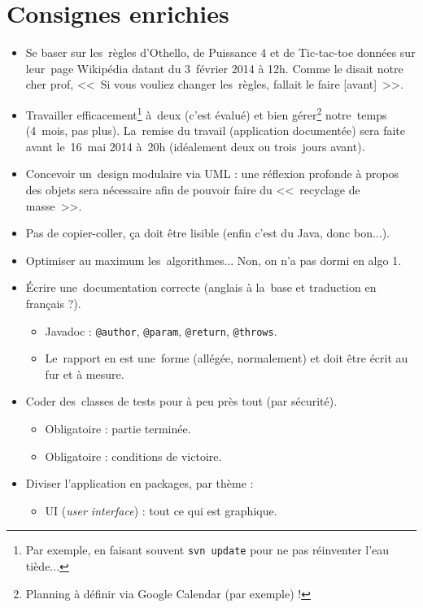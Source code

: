 \section{Consignes enrichies}
\begin{itemize}
    \item Se baser sur les~règles d'Othello, de Puissance 4 et de Tic-tac-toe données sur leur~page Wikipédia datant du 3~février 2014 à 12h. Comme le disait notre cher prof, <<~Si vous vouliez changer les~règles, fallait le faire [avant]~>>.
	\item Travailler efficacement\footnote{Par exemple, en faisant souvent \texttt{svn update} pour ne pas réinventer l'eau tiède...} à~deux (c'est évalué) et bien gérer\footnote{Planning à définir via Google Calendar (par exemple) !} notre~temps (4~mois, pas plus). La~remise du travail (application documentée) sera faite avant le~16~mai 2014 à~20h (idéalement deux ou trois~jours avant).
	\item Concevoir un~design modulaire via UML : une réflexion profonde à propos des objets sera nécessaire afin de pouvoir faire du <<~recyclage de masse~>>.
    \item Pas de copier-coller, ça doit être lisible (enfin c'est du Java, donc bon...).
	\item Optimiser au maximum les~algorithmes... Non, on n'a pas dormi en algo 1.
	\item Écrire une~documentation correcte (anglais à la~base et traduction en français ?).
        \begin{itemize}
            \item Javadoc : \texttt{@author}, \texttt{@param}, \texttt{@return}, \texttt{@throws}.
            \item Le~rapport en est une~forme (allégée, normalement) et doit être écrit au fur et à mesure.
        \end{itemize}
	\item Coder des~classes de tests pour à peu près tout (par sécurité).
        \begin{itemize}
            \item Obligatoire : partie terminée.
            \item Obligatoire : conditions de victoire.
        \end{itemize}
	\item Diviser l'application en packages, par thème :
        \begin{itemize}
            \item UI (\textit{user interface}) : tout ce qui est graphique.

\end{itemize}
\end{itemize}
